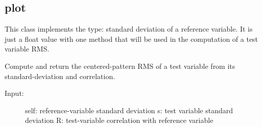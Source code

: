 \documentclass[letterpaper,10pt,english]{sphinxmanual}
\begin{document}
\subsection{plot}
\label{diagnosisutils:plot}\label{diagnosisutils:module-plot}

\begin{fulllineitems}
\label{diagnosisutils:plot.reference_std_dev}
This class implements the type: standard deviation of a reference variable.
It is just a float value with one method that will be used in the computation of
a test variable RMS.

\begin{fulllineitems}
\label{diagnosisutils:plot.reference_std_dev.compute_RMS_function}
Compute and return the centered-pattern RMS of a test variable
from its standard-deviation and correlation.
\begin{description}
\item[{Input:}] \leavevmode
self:   reference-variable standard deviation
s:      test variable standard deviation
R:      test-variable correlation with reference variable

\end{description}

\end{fulllineitems}


\end{fulllineitems}

\end{document}
